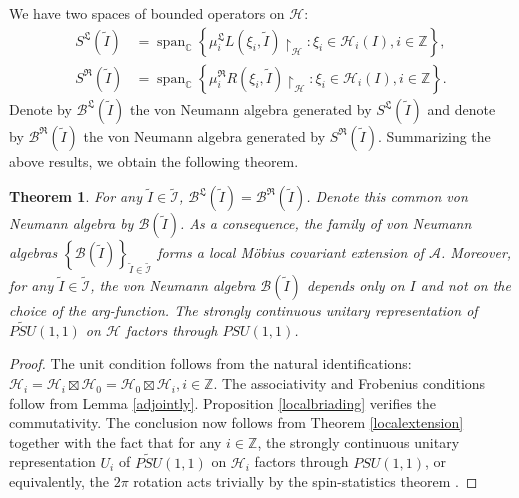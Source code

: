 \documentclass{article}
\newtheorem{theorem}{Theorem}
\newcommand{\hilb}{\mathcal{H}}
\newcommand{\B}{\mathcal{B}}
\newcommand{\C}{\mathbb{C}}
\newcommand{\A}{\mathcal{A}}
\newcommand{\Z}{\mathbb{Z}}
\begin{document}
We have two spaces of bounded operators on $\hilb$:
\begin{align*}
    S^{\mathfrak{L}}(\widetilde{I}) &=\operatorname{span}_\C \left\{  \mu_i^{\mathfrak{L}}L(\xi_i,\widetilde{I})\restriction_{\hilb}: \xi_i\in\hilb_{i}(I), i\in \Z\right\}, \\
    S^{\mathfrak{R}}(\widetilde{I}) &= \operatorname{span}_\C \left\{ \mu_i^{\mathfrak{R}}R(\xi_i,\widetilde{I})\restriction_{\hilb}: \xi_i\in\hilb_{i}(I), i \in\Z\right\}.
\end{align*}
Denote by $\B^{\mathfrak{L}}(\widetilde{I})$ the von Neumann algebra generated by $S^{\mathfrak{L}}(\widetilde{I})$ and denote by $\B^{\mathfrak{R}}(\widetilde{I})$ the von Neumann algebra generated by
$S^{\mathfrak{R}}(\widetilde{I}).$
Summarizing the above results, we obtain the following theorem.
\begin{theorem}\label{simplecurrentextension}
   For any $\widetilde{I} \in \widetilde{\mathcal{I}}$, $\B^{\mathfrak{L}}(\widetilde{I}) = \B^{\mathfrak{R}}(\widetilde{I})$. Denote this common von Neumann algebra by $\B(\widetilde{I})$. 
   As a consequence, 
   the family of von Neumann algebras $\left\{ \B(\widetilde{I})\right\}_{\widetilde{I} \in\widetilde{\mathcal{I}}}$ forms a local M\"{o}bius covariant extension of  $\A$.
   Moreover, for any $\widetilde{I}\in\widetilde{\mathcal{I}}$, 
   the von Neumann algebra $\B(\widetilde{I})$ depends only on $I$ and not on the choice of the arg-function.
   The strongly continuous unitary representation
   of $\widetilde{PSU}(1,1) $ on $\hilb$ factors through $PSU(1,1)$.
\end{theorem}
\begin{proof}
    The unit condition follows from the natural identifications: $\hilb_i = \hilb_i\boxtimes\hilb_0 = \hilb_0\boxtimes \hilb_i, i\in\Z$. The associativity and Frobenius conditions follow from Lemma \ref{adjointly}. 
    Proposition \ref{localbriading} verifies the commutativity. The conclusion now follows from Theorem \ref{localextension}
    together with the fact that for any $i\in\Z$, 
    the strongly continuous unitary representation $U_i$ of $\widetilde{PSU}(1,1)$ on $\hilb_i$ factors through $PSU(1,1)$,
    or equivalently, the $2\pi$ rotation acts trivially
    by the spin-statistics theorem \cite{guido1996conformal}. 
\end{proof}
\end{document}
